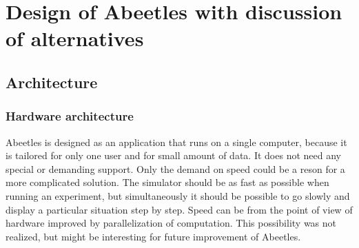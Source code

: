 \documentclass[a4paper,12pt]{report}
\begin{document}









\chapter{Design of Abeetles with discussion of alternatives}
\section{Architecture}


\subsection {Hardware architecture}

Abeetles is designed as an application that runs on a single computer, because it is tailored for only one user and for small amount of data. It does not need any special or demanding support. Only the demand on speed could be a reson for a more complicated solution. The simulator should be as fast as possible when running an experiment, but simultaneously it should be possible to go slowly and display a particular situation step by step. Speed can be from the point of view of hardware improved by parallelization of computation. This possibility was not realized, but might be interesting for future improvement of Abeetles. 
  
\end{document}
